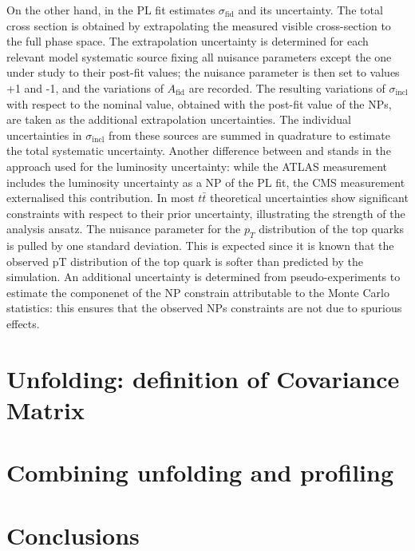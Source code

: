 \documentclass[12pt]{article}
\begin{document}
On the other hand, in \cite{CMS_inclusive} the PL fit estimates $\sigma_{\mathrm{fid}}$ and its uncertainty. The total cross section is obtained by extrapolating the measured visible cross-section to the full phase space. The extrapolation uncertainty is determined for each relevant model systematic source fixing all nuisance parameters except the one under study to their post-fit values; the nuisance parameter is then set to values +1 and -1, and the variations of $A_{\mathrm{fid}}$ are recorded. The resulting variations of $\sigma_{\mathrm{incl}}$ with respect to the nominal value, obtained with the post-fit value of the NPs, are taken as the additional extrapolation uncertainties. The individual uncertainties in $\sigma_{\mathrm{incl}}$ from these sources are summed in quadrature to estimate the total systematic uncertainty.
Another difference between \cite{Aad_2020} and \cite{CMS_inclusive} stands in the approach used for the luminosity uncertainty: while the ATLAS measurement includes the luminosity uncertainty as a NP of the PL fit, the CMS measurement externalised this contribution.
In \cite{CMS_inclusive} most $t\bar{t}$ theoretical uncertainties show significant constraints with respect to their prior uncertainty, illustrating the strength of the analysis ansatz. The nuisance parameter for the $p_T$ distribution of the top quarks is pulled by one standard deviation. This is expected since it is known that the observed pT distribution of the top quark is softer than predicted by the simulation. An additional uncertainty is determined from pseudo-experiments to estimate the componenet of the NP constrain attributable to the Monte Carlo statistics: this ensures that the observed NPs constraints are not due to spurious effects.

\section{Unfolding: definition of Covariance Matrix}

\section{Combining unfolding and profiling}

\section{Conclusions}

\end{document}
